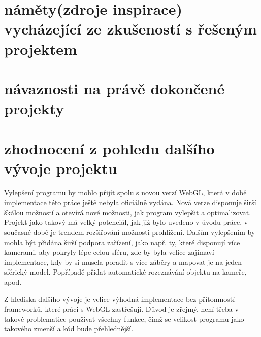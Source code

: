 \section{náměty(zdroje inspirace) vycházející ze zkušeností s řešeným projektem}
\section{návaznosti na právě dokončené projekty}


\section{zhodnocení z pohledu dalšího vývoje projektu}
Vylepšení programu by mohlo přijít spolu s novou verzí WebGL, která v době implementace této práce ještě nebyla oficiálně vydána. Nová verze disponuje širší škálou možností a otevírá nové možnosti, jak program vylepšit a optimalizovat. Projekt jako takový má velký potenciál, jak již bylo uvedeno v úvodu práce, v současné době je trendem  rozšiřování možnosti prohlížení. Dalším vylepšením by mohla být přidána širší podpora zařízení, jako např. ty, které disponují více kamerami, aby pokryly lépe celou sféru, zde by byla velice zajímaví implementace, kdy  by si musela poradit s více záběry a mapovat je na jeden sférický model. Popřípadě přidat automatické rozeznávání objektu na kameře, apod.

Z hlediska dalšího vývoje je velice výhodná implementace bez přítomností frameworků, které práci s WebGL zastřešují. Důvod je zřejmý, není třeba v takové problematice používat všechny funkce, čímž se velikost programu jako takového zmenší a kód bude přehlednější.
 


